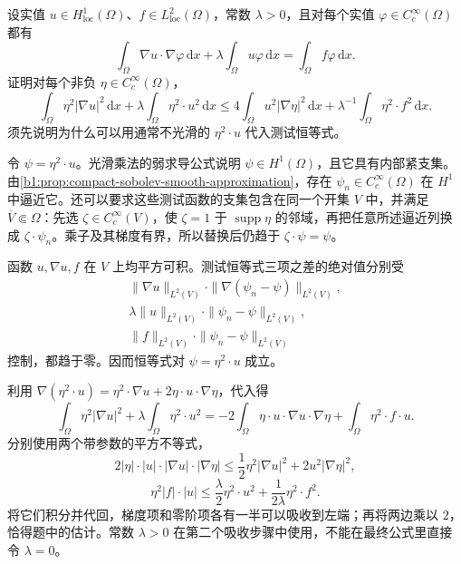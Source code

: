 \begin{exercise}\label{b1:ex:22-caccioppoli-reaction}
设实值 \(u\in H^1_{\mathrm{loc}}(\Omega)\)、\(f\in L^2_{\mathrm{loc}}(\Omega)\)，常数 \(\lambda>0\)，且对每个实值 \(\varphi\in C_c^\infty(\Omega)\) 都有
\[
 \int_\Omega\nabla u\cdot\nabla\varphi\,\mathrm dx
 +\lambda\int_\Omega u\varphi\,\mathrm dx
 =\int_\Omega f\varphi\,\mathrm dx.
\]
证明对每个非负 \(\eta\in C_c^\infty(\Omega)\)，
\[
 \int_\Omega\eta^2|\nabla u|^2\,\mathrm dx
 +\lambda\int_\Omega\eta^2\cdot u^2\,\mathrm dx
 \le4\int_\Omega u^2|\nabla\eta|^2\,\mathrm dx
     +\lambda^{-1}\int_\Omega\eta^2\cdot f^2\,\mathrm dx.
\]
须先说明为什么可以用通常不光滑的 \(\eta^2\cdot u\) 代入测试恒等式。
\end{exercise}
\begin{solution}
令 \(\psi=\eta^2\cdot u\)。光滑乘法的弱求导公式说明 \(\psi\in H^1(\Omega)\)，且它具有内部紧支集。由\cref{b1:prop:compact-sobolev-smooth-approximation}，存在 \(\psi_n\in C_c^\infty(\Omega)\) 在 \(H^1\) 中逼近它。还可以要求这些测试函数的支集包含在同一个开集 \(V\) 中，并满足 \(\overline V\Subset\Omega\)：先选 \(\zeta\in C_c^\infty(V)\)，使 \(\zeta=1\) 于 \(\operatorname{supp}\eta\) 的邻域，再把任意所述逼近列换成 \(\zeta\cdot\psi_n\)。乘子及其梯度有界，所以替换后仍趋于 \(\zeta\cdot\psi=\psi\)。

函数 \(u,\nabla u,f\) 在 \(V\) 上均平方可积。测试恒等式三项之差的绝对值分别受
\[
 \begin{gathered}
 \|\nabla u\|_{L^2(V)}\cdot\|\nabla(\psi_n-\psi)\|_{L^2(V)},\\
 \lambda\|u\|_{L^2(V)}\cdot\|\psi_n-\psi\|_{L^2(V)},\\
 \|f\|_{L^2(V)}\cdot\|\psi_n-\psi\|_{L^2(V)}
 \end{gathered}
\]
控制，都趋于零。因而恒等式对 \(\psi=\eta^2\cdot u\) 成立。

利用 \(\nabla(\eta^2\cdot u)=\eta^2\cdot\nabla u+2\eta\cdot u\cdot\nabla\eta\)，代入得
\[
 \int_\Omega\eta^2|\nabla u|^2
 +\lambda\int_\Omega\eta^2\cdot u^2
 =-2\int_\Omega\eta\cdot u\cdot\nabla u\cdot\nabla\eta
   +\int_\Omega\eta^2\cdot f\cdot u.
\]
分别使用两个带参数的平方不等式，
\[
 2|\eta|\cdot|u|\cdot|\nabla u|\cdot|\nabla\eta|
 \le\frac12\eta^2|\nabla u|^2+2u^2|\nabla\eta|^2,
\]
\[
 \eta^2|f|\cdot|u|
 \le\frac{\lambda}{2}\eta^2\cdot u^2+\frac1{2\lambda}\eta^2\cdot f^2.
\]
将它们积分并代回，梯度项和零阶项各有一半可以吸收到左端；再将两边乘以 \(2\)，恰得题中的估计。常数 \(\lambda>0\) 在第二个吸收步骤中使用，不能在最终公式里直接令 \(\lambda=0\)。
\end{solution}

